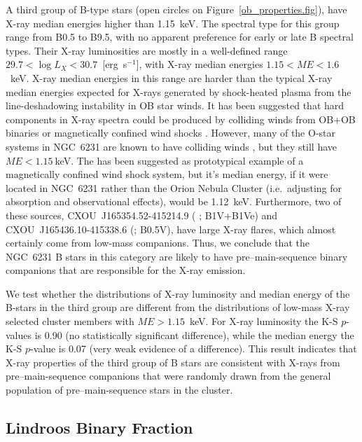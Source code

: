 \documentclass[twocolumn,tighten]{aastex61}
\begin{document}
A third group of B-type stars (open circles on Figure~\ref{ob_properties.fig}), have X-ray median energies higher than 1.15~keV. The spectral type for this group range from B0.5 to B9.5, with no apparent preference for early or late B spectral types. Their X-ray luminosities are mostly in a well-defined range $29.7<\log L_X<30.7$~[erg~s$^{-1}$], with X-ray median energies $1.15<ME<1.6$~keV. 
X-ray median energies in this range are harder than the typical X-ray median energies expected for X-rays generated by shock-heated plasma from the line-deshadowing instability in OB star winds. It has been suggested that hard components in X-ray spectra could be produced by colliding winds from OB+OB binaries or magnetically confined wind shocks \citep{2015arXiv150906482U}. However, many of the O-star systems in NGC~6231 are known to have colliding winds \citep{2004MNRAS.350..809S,2006MNRAS.371...67S,2005A&A...441..213S,2008NewA...13..202S}, but they still have $ME<1.15~$keV. The   has been suggested as prototypical example of a magnetically confined wind shock system, but it's median energy, if it were located in NGC~6231 rather than the Orion Nebula Cluster (i.e.\ adjusting for absorption and observational effects), would be 1.12~keV.  Furthermore, two of these sources, CXOU~J165354.52-415214.9 ( ; B1V+B1Ve) and CXOU~J165436.10-415338.6 (; B0.5V), have large X-ray flares, which almost certainly come from low-mass companions. Thus, we conclude that the NGC~6231 B stars in this category are likely to have pre--main-sequence binary companions that are responsible for the X-ray emission.
 
We test whether the distributions of X-ray luminosity and median energy of the B-stars in the third group are different from the distributions of low-mass X-ray selected cluster members with $ME>1.15$~keV. For X-ray luminosity the K-S $p$-values is 0.90 (no statistically significant difference), while the median energy the K-S $p$-value is 0.07 (very weak evidence of a difference). This result indicates that X-ray properties of the third group of B stars are consistent with X-rays from pre--main-sequence companions that were randomly drawn from the general population of pre--main-sequence stars in the cluster. 


\subsection{Lindroos Binary Fraction \label{lindroos.sec}}
\end{document}

